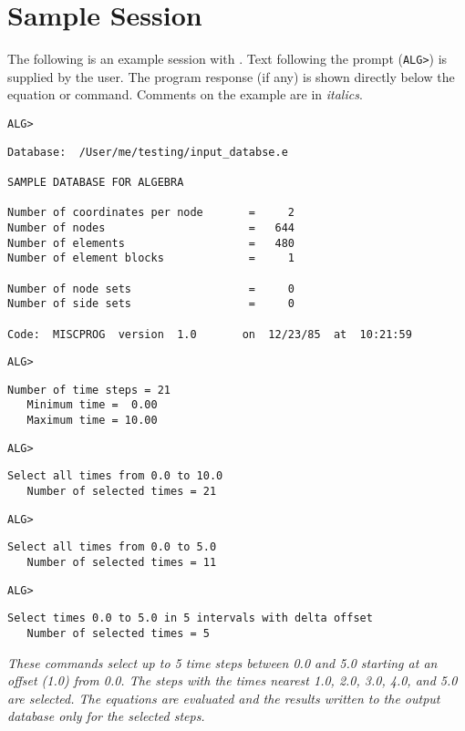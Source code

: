 \chapter{Sample Session} \label{appx:example}

The following is an example session with \caps{\PROGRAM}. Text following
the \caps{\PROGRAM} prompt (\verb|ALG>|) is supplied by the user. The
program response (if any) is shown directly below the equation or
command. Comments on the example are in {\em italics}.

\newenvironment{comments} {\em}{}

\verb|ALG>| 
\begin{verbatim}
Database:  /User/me/testing/input_databse.e

SAMPLE DATABASE FOR ALGEBRA

Number of coordinates per node       =     2
Number of nodes                      =   644
Number of elements                   =   480
Number of element blocks             =     1

Number of node sets                  =     0
Number of side sets                  =     0

Code:  MISCPROG  version  1.0       on  12/23/85  at  10:21:59
\end{verbatim}

\verb|ALG>| 
\begin{verbatim}
Number of time steps = 21
   Minimum time =  0.00
   Maximum time = 10.00
\end{verbatim}

\newpage
\verb|ALG>| 
\vspace{-\medskipamount} 
\begin{verbatim}
Select all times from 0.0 to 10.0
   Number of selected times = 21
\end{verbatim}
\verb|ALG>| 
\vspace{-\medskipamount} 
\begin{verbatim}
Select all times from 0.0 to 5.0
   Number of selected times = 11
\end{verbatim}
\verb|ALG>| 
\vspace{-\medskipamount} 
\begin{verbatim}
Select times 0.0 to 5.0 in 5 intervals with delta offset
   Number of selected times = 5
\end{verbatim}

\begin{comments}
These commands select up to 5 time steps between 0.0 and 5.0 starting at
an offset (1.0) from 0.0. The steps with the times nearest 1.0, 2.0,
3.0, 4.0, and 5.0 are selected. The equations are evaluated and the
results written to the output database only for the selected steps.
\end{comments}

